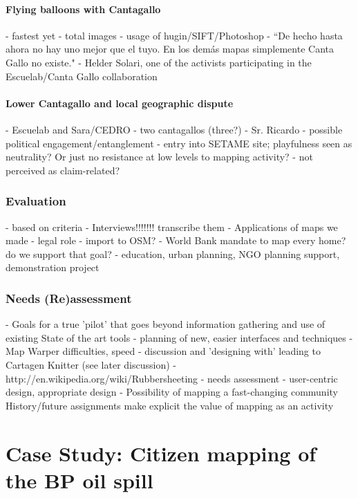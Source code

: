 \documentclass[11pt]{report}
\begin{document}
\subsubsection{Flying balloons with Cantagallo}
- fastest yet
                - total images
                - usage of hugin/SIFT/Photoshop
	- ``De hecho hasta ahora no hay uno mejor que el tuyo. En los demás mapas simplemente Canta Gallo no existe." - Helder Solari, one of the activists participating in the Escuelab/Canta Gallo collaboration

\subsubsection{Lower Cantagallo and local geographic dispute}
            - Escuelab and Sara/CEDRO
	- two cantagallos (three?)
            - Sr. Ricardo - possible political engagement/entanglement
            - entry into SETAME site; playfulness seen as neutrality? Or just no resistance at low levels to mapping activity?
                - not perceived as claim-related?

\subsection{Evaluation}
- based on criteria
        - Interviews!!!!!!! transcribe them
        - Applications of maps we made
            - legal role
            - import to OSM?
            - World Bank mandate to map every home? do we support that goal?
            - education, urban planning, NGO planning support, demonstration project
\subsection{Needs (Re)assessment}
- Goals for a true 'pilot' that goes beyond information gathering and use of existing State of the art tools
   - planning of new, easier interfaces and techniques
                - Map Warper difficulties, speed
            - discussion and 'designing with' leading to Cartagen Knitter (see later discussion)
		- http://en.wikipedia.org/wiki/Rubbersheeting
            - needs assessment - user-centric design, appropriate design
    - Possibility of mapping a fast-changing community
        History/future assignments make explicit the value of mapping as an activity

\chapter{Case Study: Citizen mapping of the BP oil spill}
\end{document}
